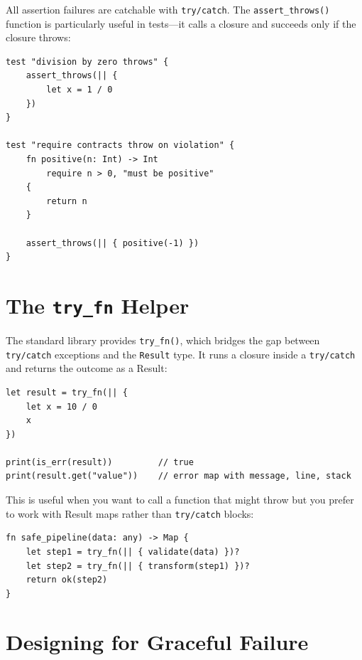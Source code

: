 All assertion failures are catchable with \lstinline|try/catch|. The \lstinline|assert_throws()| function is particularly useful in tests---it calls a closure and succeeds only if the closure throws:

\begin{lstlisting}[language=Lattice, caption={Testing that code throws}]
test "division by zero throws" {
    assert_throws(|| {
        let x = 1 / 0
    })
}

test "require contracts throw on violation" {
    fn positive(n: Int) -> Int
        require n > 0, "must be positive"
    {
        return n
    }

    assert_throws(|| { positive(-1) })
}
\end{lstlisting}

\section{The \texttt{try\_fn} Helper}\label{sec:try-fn}

The standard library provides \lstinline|try_fn()|, which bridges the gap between \lstinline|try/catch| exceptions and the \lstinline|Result| type. It runs a closure inside a \lstinline|try/catch| and returns the outcome as a Result:

\begin{lstlisting}[language=Lattice, caption={try\_fn converts exceptions to Results}]
let result = try_fn(|| {
    let x = 10 / 0
    x
})

print(is_err(result))         // true
print(result.get("value"))    // error map with message, line, stack
\end{lstlisting}

This is useful when you want to call a function that might throw but you prefer to work with Result maps rather than \lstinline|try/catch| blocks:

\begin{lstlisting}[language=Lattice, caption={Using try\_fn with the ? operator}]
fn safe_pipeline(data: any) -> Map {
    let step1 = try_fn(|| { validate(data) })?
    let step2 = try_fn(|| { transform(step1) })?
    return ok(step2)
}
\end{lstlisting}

\section{Designing for Graceful Failure}\label{sec:graceful-failure}

